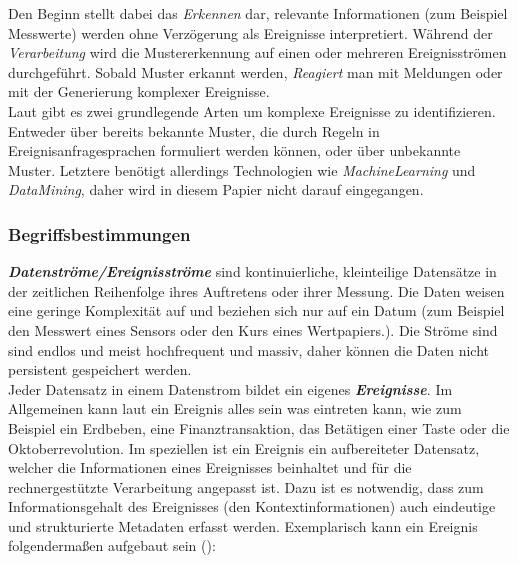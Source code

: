 \documentclass{acm_proc_article-sp}
\begin{document}
Den Beginn stellt dabei das \emph{Erkennen} dar, relevante Informationen (zum Beispiel 
Messwerte) werden ohne Verzögerung als Ereignisse interpretiert. Während der 
\emph{Verarbeitung} wird die Mustererkennung auf einen oder mehreren Ereignisströmen 
durchgeführt. Sobald Muster erkannt werden, \emph{Reagiert} man mit Meldungen oder mit 
der Generierung komplexer Ereignisse.\\
Laut \cite{eckert} gibt es zwei grundlegende Arten um 
komplexe Ereignisse zu identifizieren. Entweder über bereits bekannte Muster, die durch 
Regeln in Ereignisanfragesprachen formuliert werden können, oder über unbekannte Muster. 
Letztere benötigt allerdings Technologien wie \textit{MachineLearning} und 
\textit{DataMining}, daher wird in diesem Papier nicht darauf eingegangen.

\subsubsection{Begriffsbestimmungen}\label{begriffsbestimmung}
\vspace{0.1cm}
\textbf{\textit{Datenströme/Ereignisströme}}
sind kontinuierliche, kleinteilige Datensätze in der 
zeitlichen Reihenfolge ihres Auftretens oder ihrer Messung. Die Daten weisen eine geringe 
Komplexität auf und beziehen sich nur auf ein Datum (zum Beispiel den Messwert eines 
Sensors oder den Kurs eines Wertpapiers.). Die Ströme sind sind endlos und meist 
hochfrequent und massiv, daher können die Daten nicht persistent gespeichert werden.\\
Jeder Datensatz in einem Datenstrom bildet ein eigenes 
\textbf{\textit{Ereignisse}}. Im 
Allgemeinen kann laut \cite{glossary} ein Ereignis alles sein was eintreten kann, wie zum 
Beispiel ein Erdbeben, eine Finanztransaktion, das Betätigen einer Taste oder die 
Oktoberrevolution. Im speziellen ist ein Ereignis ein aufbereiteter Datensatz, welcher 
die Informationen eines Ereignisses beinhaltet und für die rechnergestützte Verarbeitung 
angepasst ist. Dazu ist es notwendig, dass zum Informationsgehalt des Ereignisses (den 
Kontextinformationen) auch eindeutige und strukturierte Metadaten erfasst werden. 
Exemplarisch 
kann ein Ereignis folgendermaßen aufgebaut sein (\cite{hedtstuck}):
\end{document}
